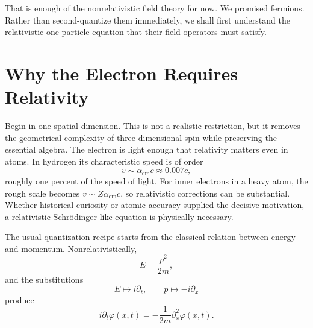 \begin{classroomqa}
\end{classroomqa}

\begin{classroomqa}
\end{classroomqa}

That is enough of the nonrelativistic field theory for now. We promised fermions. Rather than second-quantize them immediately, we shall first understand the relativistic one-particle equation that their field operators must satisfy.

\section{Why the Electron Requires Relativity}

Begin in one spatial dimension. This is not a realistic restriction, but it removes the geometrical complexity of three-dimensional spin while preserving the essential algebra. The electron is light enough that relativity matters even in atoms. In hydrogen its characteristic speed is of order
\begin{equation}
v\sim\alpha_{\mathrm{em}}c\approx 0.007c,
\end{equation}
roughly one percent of the speed of light. For inner electrons in a heavy atom, the rough scale becomes \(v\sim Z\alpha_{\mathrm{em}}c\), so relativistic corrections can be substantial. Whether historical curiosity or atomic accuracy supplied the decisive motivation, a relativistic Schr\"odinger-like equation is physically necessary.

The usual quantization recipe starts from the classical relation between energy and momentum. Nonrelativistically,
\begin{equation}
E=\frac{p^2}{2m},
\end{equation}
and the substitutions
\begin{equation}
E\mapsto i\partial_t,
\qquad
p\mapsto-i\partial_x
\end{equation}
produce
\begin{equation}
i\partial_t\varphi(x,t)
=-\frac{1}{2m}\partial_x^2\varphi(x,t).
\end{equation}

